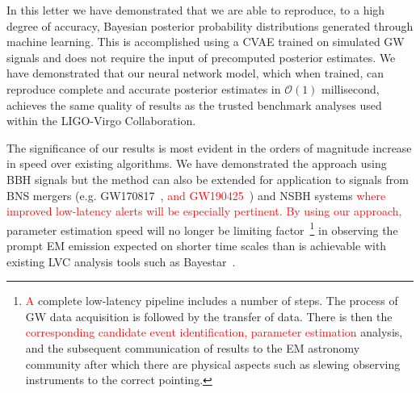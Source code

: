 \documentclass[%
showpacs,
nofootinbib,
 amsmath,amssymb,
 aps,
 twocolumn,
 prl,
 reprint,
floatfix,
]{revtex4-1}
\newcommand{\new}[1]{\textcolor{red}{#1}}
\begin{document}
%
%

%
%
%
In this letter we have demonstrated that we are able to reproduce, to a high
degree of accuracy, Bayesian posterior probability distributions generated
through machine learning. This is accomplished using a \ac{CVAE} trained on
simulated \ac{GW} signals and does not require the input of precomputed
posterior estimates. We have demonstrated that our neural network model, which
when trained, can reproduce complete and accurate posterior estimates in
$\mathcal{O}(1)$ millisecond, achieves the same quality of results as the
trusted benchmark analyses used within the LIGO-Virgo Collaboration.

%
%
The significance of our results is most evident in the orders of magnitude
increase in speed over existing algorithms. We have demonstrated the approach
using \ac{BBH} signals but the method can also be extended for application to
signals from \ac{BNS} mergers (e.g.  GW170817~\cite{PhysRevLett.119.161101},
\new{and GW190425~\cite{2020ApJ...892L...3A}}) and \ac{NSBH} systems \new{where
improved low-latency alerts will be especially pertinent.} \new{By using our
approach,} parameter estimation speed will no longer be limiting
factor~\footnote{\new{A} complete low-latency pipeline includes a number of
steps. The process of \ac{GW} data acquisition is followed by the transfer of
data. There is then the \new{corresponding candidate event identification,
parameter estimation} analysis, and the subsequent communication of results to
the \ac{EM} astronomy community after which there are physical aspects such as
slewing observing instruments to the correct pointing.} in observing the prompt
\ac{EM} emission expected on shorter time scales than is achievable with
existing \ac{LVC} analysis tools such as Bayestar~\cite{2016PhRvD..93b4013S}.
\end{document}
